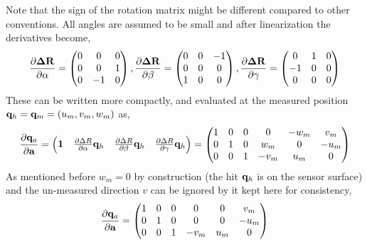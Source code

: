 \documentclass{article}
\def\vec#1{\ensuremath{\mathrm{\bf #1}}}
\def\partder#1#2{\ensuremath{\frac{\partial #1}{\partial #2}}}
\begin{document}
Note that the sign of the rotation matrix might be different compared to other conventions.
All angles are assumed to be small and after linearization the derivatives become,
\[
\partder{\vec{\Delta R}}{\alpha} = 
\begin{pmatrix}
 0 & 0 & 0 \\
 0 & 0 & 1 \\
 0 & -1 & 0
 \end{pmatrix}
 ,  \partder{\vec{\Delta R}}{\beta} = 
\begin{pmatrix}
 0 & 0 & -1 \\
 0 & 0 & 0 \\
 1 & 0 & 0
 \end{pmatrix}
 ,  \partder{\vec{ \Delta R}}{\gamma} = 
\begin{pmatrix}
0 & 1 & 0 \\
-1 & 0 & 0 \\
0 & 0 & 0
 \end{pmatrix}
 \label{eq:dDeltaR}
\]
These can be written more compactly, and evaluated at the measured position $\vec{q}_h=\vec{q}_m=\left ( u_m, v_m, w_m \right)$ as,
\[
\partder{\vec{q}_a}{\vec{a}} = 
\begin{pmatrix}
\vec{1} & \partder{\Delta R}{\alpha} \vec{q}_h & \partder{\Delta R}{\beta} \vec{q}_h & \partder{\Delta R}{\gamma} \vec{q}_h 
\end{pmatrix} 
= 
\begin{pmatrix}
1 & 0 & 0 & 0       & -w_m & v_m  \\
0 & 1 & 0 & w_m & 0        & -u_m \\
0 & 0 & 1 & -v_m  & u_m  & 0        
\end{pmatrix}
\]
As mentioned before $w_m=0$ by construction (the hit $\vec{q}_h$ is on the sensor surface) and the un-measured direction $v$ can be ignored by it kept here for consistency,
\[
\partder{\vec{q}_a}{\vec{a}} = 
\begin{pmatrix}
1 & 0 & 0 & 0       & 0 & v_m \\
0 & 1 & 0 & 0 & 0        & -u_m \\
0 & 0 & 1 & -v_m  & u_m  & 0        
\end{pmatrix}
\]
\end{document}
